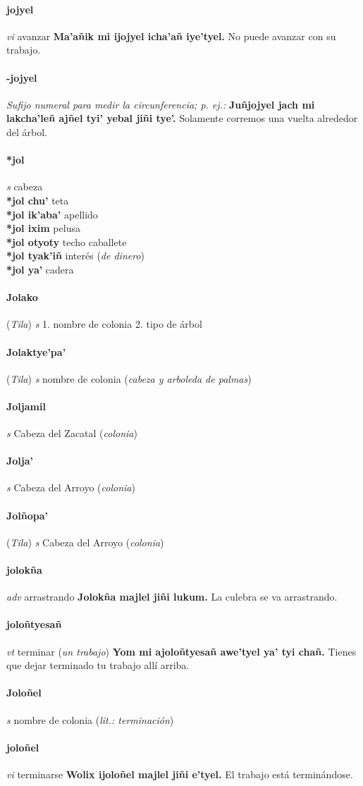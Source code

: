 \documentclass{scrbook}
\newcommand{\entry}[1]{\paragraph{#1}}
\newcommand{\onedefinition}[1]{#1.}
\newcommand{\nontranslationdef}[1]{\textit{#1}}
\newcommand{\partofspeech}[1]{\textit{#1}}
\newcommand{\spanishtranslation}[1]{#1}
\newcommand{\clarification}[1]{(\textit{#1})}
\newcommand{\cholexample}[1]{\textbf{#1}}
\newcommand{\exampletranslation}[1]{#1}
\newcommand{\relevantdialect}[1]{(\textit{#1})}
\newcommand{\secondaryentry}[1]{\\\textbf{#1}}
\newcommand{\secondtranslation}[1]{#1}
\begin{document}
\begin{multicols}{2}
\entry{jojyel}
\partofspeech{vi}
\spanishtranslation{avanzar}
\cholexample{Ma'añik mi ijojyel icha'añ iye'tyel.}
\exampletranslation{No puede avanzar con su trabajo.}

\entry{-jojyel}
\nontranslationdef{Sufijo numeral para medir la circunferencia; p. ej.:}
\cholexample{Juñjojyel jach mi lakcha'leñ ajñel tyi' yebal jiñi tye'.}
\exampletranslation{Solamente corremos una vuelta alrededor del árbol.}

\entry{*jol}
\partofspeech{s}
\spanishtranslation{cabeza}
\secondaryentry{*jol chu'}
\secondtranslation{teta}
\secondaryentry{*jol ik'aba'}
\secondtranslation{apellido}
\secondaryentry{*jol ixim}
\secondtranslation{pelusa}
\secondaryentry{*jol otyoty}
\secondtranslation{techo}
\secondtranslation{caballete}
\secondaryentry{*jol tyak'iñ}
\secondtranslation{interés}
\clarification{de dinero}
\secondaryentry{*jol ya'}
\secondtranslation{cadera}

\entry{Jolako}
\relevantdialect{Tila}
\partofspeech{s}
\onedefinition{1}
\spanishtranslation{nombre de colonia}
\onedefinition{2}
\spanishtranslation{tipo de árbol}

\entry{Jolaktye'pa'}
\relevantdialect{Tila}
\partofspeech{s}
\secondtranslation{nombre de colonia}
\clarification{cabeza y arboleda de palmas}

\entry{Joljamil}
\partofspeech{s}
\spanishtranslation{Cabeza del Zacatal}
\clarification{colonia}

\entry{Jolja'}
\partofspeech{s}
\spanishtranslation{Cabeza del Arroyo}
\clarification{colonia}

\entry{Jolñopa'}
\relevantdialect{Tila}
\partofspeech{s}
\spanishtranslation{Cabeza del Arroyo}
\clarification{colonia}

\entry{jolokña}
\partofspeech{adv}
\spanishtranslation{arrastrando}
\cholexample{Jolokña majlel jiñi lukum.}
\exampletranslation{La culebra se va arrastrando.}

\entry{joloñtyesañ}
\partofspeech{vt}
\spanishtranslation{terminar}
\clarification{un trabajo}
\cholexample{Yom mi ajoloñtyesañ awe'tyel ya' tyi chañ.}
\exampletranslation{Tienes que dejar terminado tu trabajo allí arriba.}

\entry{Joloñel}
\partofspeech{s}
\spanishtranslation{nombre de colonia}
\clarification{lit.: terminación}

\entry{joloñel}
\partofspeech{vi}
\spanishtranslation{terminarse}
\cholexample{Wolix ijoloñel majlel jiñi e'tyel.}
\exampletranslation{El trabajo está terminándose.}


\end{multicols}
\end{document}
